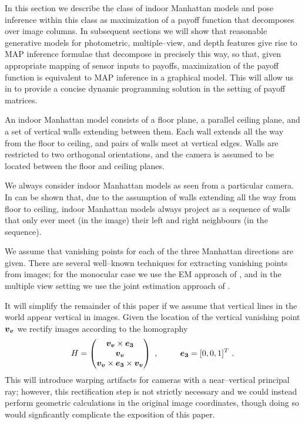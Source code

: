 \documentclass{article}
\newcommand\vvpt{\vect{v_v}}
\begin{document}
In this section we describe the class of indoor Manhattan models and
pose inference within this class as maximization of a payoff function
that decomposes over image columns. In subsequent sections we will
show that reasonable generative models for photometric,
multiple--view, and depth features give rise to MAP inference formulae
that decompose in precisely this way, so that, given appropriate
mapping of sensor inputs to payoffs, maximization of the payoff
function is equivalent to MAP inference in a graphical model. This
will allow us in  to provide a concise dynamic
programming solution in the setting of payoff matrices.

An indoor Manhattan model consists of a floor plane, a parallel
ceiling plane, and a set of vertical walls extending between
them. Each wall extends all the way from the floor to ceiling, and
pairs of walls meet at vertical edges. Walls are restricted to two
orthogonal orientations, and the camera is assumed to be located
between the floor and ceiling planes.

We always consider indoor Manhattan models as seen from a particular
camera. In can be shown that, due to the assumption of walls extending
all the way from floor to ceiling, indoor Manhattan models always
project as a sequence of walls that only ever meet (in the image) their
left and right neighbours (in the sequence).

We assume that vanishing points for each of the three Manhattan
directions are given. There are several well--known techniques for
extracting vanishing points from images\cite{Shufelt99}; for the
monocular case we use the EM approach of \cite{Zhang02}, and in the
multiple view setting we use the joint estimation approach of
\cite{FlintCVPR10}.

It will simplify the remainder of this paper if we assume that
vertical lines in the world appear vertical in images. Given the
location of the vertical vanishing point $\vvpt$ we rectify images
according to the homography
\begin{equation}
  H = 
  \begin{pmatrix}
    \vvpt \times \vect{e_3} \\
    \vvpt \\
    \vvpt \times \vect{e_3} \times \vvpt
  \end{pmatrix}
  ~,~~~~~~~~ \vect{e_3}=[0,0,1]^T ~.
\end{equation}
This will introduce warping artifacts for cameras with a
near--vertical principal ray; however, this rectification step is not
strictly necessary and we could instead perform geometric calculations
in the original image coordinates, though doing so would signficantly
complicate the exposition of this paper.
\end{document}
